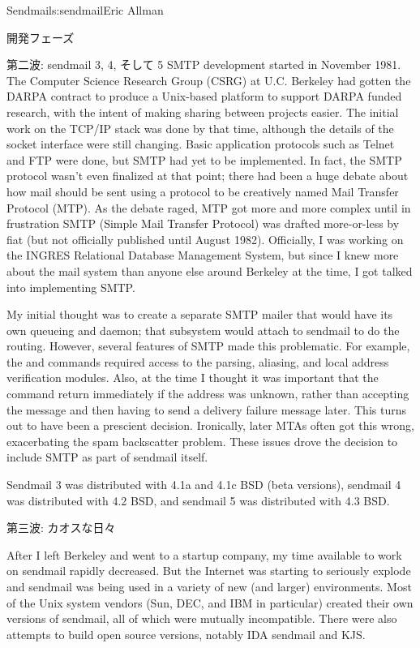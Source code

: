 \begin{aosachapter}{Sendmail}{s:sendmail}{Eric Allman}
\begin{aosasect1}{開発フェーズ}
\begin{aosasect2}{第二波: sendmail 3, 4, そして 5}
SMTP development started in November 1981.
The Computer Science Research Group (CSRG) at U.C. Berkeley had gotten
the DARPA contract to produce a Unix-based platform to support DARPA
funded research, with the intent of making sharing between projects
easier.  The initial work on the TCP/IP stack was done by that time,
although the details of the socket interface were still changing.
Basic application protocols such as Telnet and FTP were done, but SMTP
had yet to be implemented. In fact, the SMTP protocol wasn't even
finalized at that point; there had been a huge debate about how mail
should be sent using a protocol to be creatively named Mail Transfer
Protocol (MTP). As the debate raged, MTP got more and more complex
until in frustration SMTP (Simple Mail Transfer Protocol) was drafted
more-or-less by fiat (but not officially published until August 1982).
Officially, I was working on the INGRES Relational Database Management
System, but since I knew more about the mail system than anyone else
around Berkeley at the time, I got talked into implementing SMTP.

My initial thought was to create a separate SMTP mailer that would
have its own queueing and daemon; that subsystem would attach to
sendmail to do the routing. However, several features of SMTP made
this problematic. For example, the  and  commands required
access to the parsing, aliasing, and local address verification
modules. Also, at the time I thought it was important that the 
command return immediately if the address was unknown, rather than
accepting the message and then having to send a delivery failure
message later. This turns out to have been a prescient
decision. Ironically, later MTAs often got this wrong, exacerbating
the spam backscatter problem. These issues drove the decision to
include SMTP as part of sendmail itself.

Sendmail 3 was distributed with 4.1a and 4.1c BSD (beta versions),
sendmail 4 was distributed with 4.2 BSD, and sendmail 5 was
distributed with 4.3 BSD.

\end{aosasect2}

\begin{aosasect2}{第三波: カオスな日々}

After I left Berkeley and went to a startup company, my time available
to work on sendmail rapidly decreased. But the Internet was starting
to seriously explode and sendmail was being used in a variety of new
(and larger) environments. Most of the Unix system vendors (Sun, DEC,
and IBM in particular) created their own versions of sendmail, all of
which were mutually incompatible. There were also attempts to build
open source versions, notably IDA sendmail and KJS.


\end{aosasect2}
\end{aosasect1}
\end{aosachapter}
